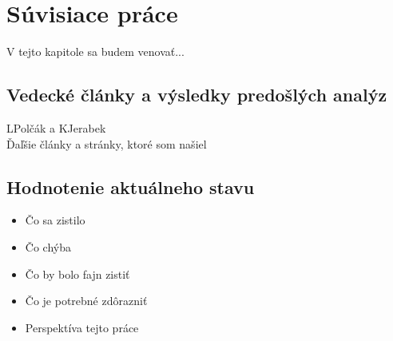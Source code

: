 \chapter{Súvisiace práce}
\label{related-work}

V tejto kapitole sa budem venovať...


\section{Vedecké články a výsledky predošlých analýz}

LPolčák a KJerabek \cite{nel-http-archive}\cite{dp-security-issues-nel}
\\
Ďaľšie články a stránky, ktoré som našiel

\section{Hodnotenie aktuálneho stavu}

\begin{itemize}
\item Čo sa zistilo
\item Čo chýba
\item Čo by bolo fajn zistiť
\item Čo je potrebné zdôrazniť
\item Perspektíva tejto práce
\end{itemize}
